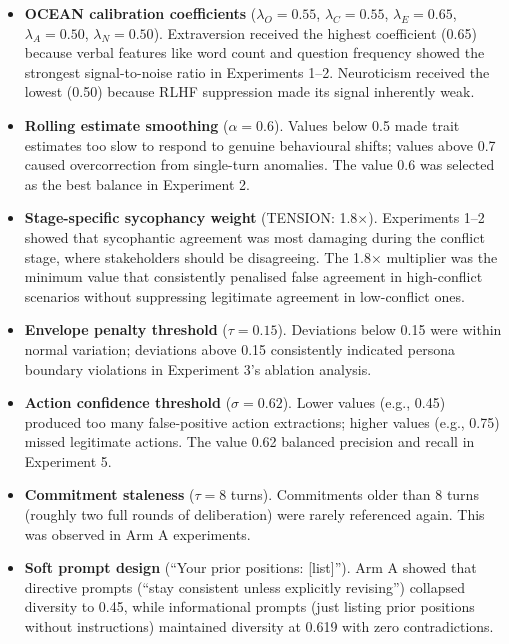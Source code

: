 \documentclass[12pt, a4paper]{report}
\begin{document}
\begin{itemize}[leftmargin=*, itemsep=2pt]
    \item \textbf{OCEAN calibration coefficients} ($\lambda_O = 0.55$, $\lambda_C = 0.55$, $\lambda_E = 0.65$, $\lambda_A = 0.50$, $\lambda_N = 0.50$). Extraversion received the highest coefficient (0.65) because verbal features like word count and question frequency showed the strongest signal-to-noise ratio in Experiments 1--2. Neuroticism received the lowest (0.50) because RLHF suppression made its signal inherently weak.

    \item \textbf{Rolling estimate smoothing} ($\alpha = 0.6$). Values below 0.5 made trait estimates too slow to respond to genuine behavioural shifts; values above 0.7 caused overcorrection from single-turn anomalies. The value 0.6 was selected as the best balance in Experiment 2.

    \item \textbf{Stage-specific sycophancy weight} (TENSION: 1.8$\times$). Experiments 1--2 showed that sycophantic agreement was most damaging during the conflict stage, where stakeholders should be disagreeing. The 1.8$\times$ multiplier was the minimum value that consistently penalised false agreement in high-conflict scenarios without suppressing legitimate agreement in low-conflict ones.

    \item \textbf{Envelope penalty threshold} ($\tau = 0.15$). Deviations below 0.15 were within normal variation; deviations above 0.15 consistently indicated persona boundary violations in Experiment 3's ablation analysis.

    \item \textbf{Action confidence threshold} ($\sigma = 0.62$). Lower values (e.g., 0.45) produced too many false-positive action extractions; higher values (e.g., 0.75) missed legitimate actions. The value 0.62 balanced precision and recall in Experiment 5.

    \item \textbf{Commitment staleness} ($\tau = 8$ turns). Commitments older than 8 turns (roughly two full rounds of deliberation) were rarely referenced again. This was observed in Arm A experiments.

    \item \textbf{Soft prompt design} (``Your prior positions: [list]''). Arm A showed that directive prompts (``stay consistent unless explicitly revising'') collapsed diversity to 0.45, while informational prompts (just listing prior positions without instructions) maintained diversity at 0.619 with zero contradictions.
\end{itemize}
\end{document}
